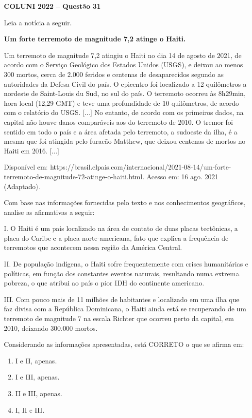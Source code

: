 \textbf{COLUNI 2022 -- Questão 31}\par\medskip Leia a notícia a seguir.

\par

\textbf{Um forte terremoto de magnitude 7,2 atinge o Haiti.}

\par

Um terremoto de magnitude 7,2 atingiu o Haiti no dia 14 de agosto de 2021, de acordo com o Serviço Geológico dos Estados Unidos (USGS), e deixou ao menos 300 mortos, cerca de 2.000 feridos e centenas de desaparecidos segundo as autoridades da Defesa Civil do país. O epicentro foi localizado a 12 quilômetros a nordeste de Saint-Louis du Sud, no sul do país. O terremoto ocorreu às 8h29min, hora local (12,29 GMT) e teve uma profundidade de 10 quilômetros, de acordo com o relatório do USGS. [...] No entanto, de acordo com os primeiros dados, na capital não houve danos comparáveis aos do terremoto de 2010. O tremor foi sentido em todo o país e a área afetada pelo terremoto, a sudoeste da ilha, é a mesma que foi atingida pelo furacão Matthew, que deixou centenas de mortos no Haiti em 2016. [...]

\par

Disponível em: https://brasil.elpais.com/internacional/2021-08-14/um-forte-terremoto-de-magnitude-72-atinge-o-haiti.html. Acesso em: 16 ago. 2021 (Adaptado).

\par

Com base nas informações fornecidas pelo texto e nos conhecimentos geográficos, analise as afirmativas a seguir:

\par

I. O Haiti é um país localizado na área de contato de duas placas tectônicas, a placa do Caribe e a placa norte-americana, fato que explica a frequência de terremotos que acontecem nessa região da América Central.\par
II. De população indígena, o Haiti sofre frequentemente com crises humanitárias e políticas, em função dos constantes eventos naturais, resultando numa extrema pobreza, o que atribui ao país o pior IDH do continente americano.\par
III. Com pouco mais de 11 milhões de habitantes e localizado em uma ilha que faz divisa com a República Dominicana, o Haiti ainda está se recuperando de um terremoto de magnitude 7 na escala Richter que ocorreu perto da capital, em 2010, deixando 300.000 mortos.

\par

Considerando as informações apresentadas, está CORRETO o que se afirma em:\begin{enumerate}
\item I e II, apenas.
\item I e III, apenas.
\item II e III, apenas.
\item I, II e III.\end{enumerate}
